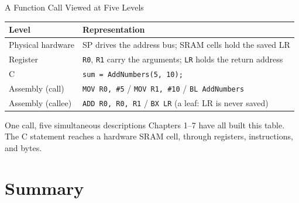 \documentclass[9pt,aspectratio=169,xcolor=table]{beamer}
\begin{document}
\begin{frame}{A Function Call Viewed at Five Levels}
    \begin{center}
    {\small
    \striped
    \begin{tabular}{@{}l R{.68\textwidth}@{}}
        \toprule
        \textbf{Level} & \textbf{Representation} \\
        \midrule
        Physical hardware   & SP drives the address bus; SRAM cells hold the saved LR \\
        Register            & \texttt{R0}, \texttt{R1} carry the arguments; \texttt{LR} holds the return address \\
        C                   & \texttt{sum = AddNumbers(5, 10);} \\
        Assembly (call)     & \texttt{MOV R0, \#5} / \texttt{MOV R1, \#10} / \texttt{BL AddNumbers} \\
        Assembly (callee)   & \texttt{ADD R0, R0, R1} / \texttt{BX LR} (a leaf: LR is never saved) \\
        \bottomrule
    \end{tabular}}
    \end{center}

    \vspace{3mm}
    \begin{block}{One call, five simultaneous descriptions}
        Chapters 1--7 have all built this table. The C statement reaches
        a hardware SRAM cell, through registers, instructions, and bytes.
    \end{block}
\end{frame}


\section{Summary}
\end{document}

